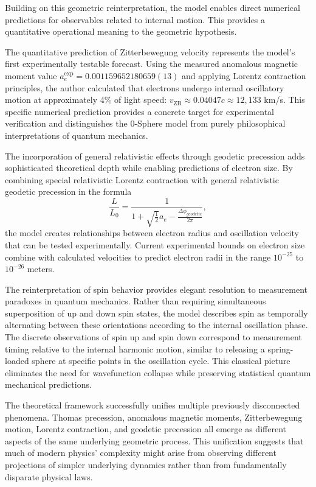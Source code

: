 \documentclass[%
 reprint,
 amsmath,amssymb,
 aps,
]{revtex4-1}
\numberwithin{equation}{section}%
\begin{document}
Building on this geometric reinterpretation, the model enables direct numerical predictions for observables related to internal motion. This provides a quantitative operational meaning to the geometric hypothesis.

The quantitative prediction of Zitterbewegung velocity represents the model's first experimentally testable forecast. Using the measured anomalous magnetic moment value $a_e^{\exp} = 0.001159652180659(13)$ and applying Lorentz contraction principles, the author calculated that electrons undergo internal oscillatory motion at approximately 4\% of light speed: $v_{\mathrm{ZB}} \approx 0.04047c \approx 12,133$ km/s. This specific numerical prediction provides a concrete target for experimental verification and distinguishes the 0-Sphere model from purely philosophical interpretations of quantum mechanics.

The incorporation of general relativistic effects through geodetic precession adds sophisticated theoretical depth while enabling predictions of electron size. By combining special relativistic Lorentz contraction with general relativistic geodetic precession in the formula
\begin{equation}
\frac{L}{L_0} = \frac{1}{1 + \sqrt{\frac{1}{2}}a_e - \frac{\Delta\phi_{geodetic}}{2\pi}},
\end{equation}
the model creates relationships between electron radius and oscillation velocity that can be tested experimentally. Current experimental bounds on electron size combine with calculated velocities to predict electron radii in the range $10^{-25}$ to $10^{-26}$ meters.

The reinterpretation of spin behavior provides elegant resolution to measurement paradoxes in quantum mechanics. Rather than requiring simultaneous superposition of up and down spin states, the model describes spin as temporally alternating between these orientations according to the internal oscillation phase. The discrete observations of spin up and spin down correspond to measurement timing relative to the internal harmonic motion, similar to releasing a spring-loaded sphere at specific points in the oscillation cycle. This classical picture eliminates the need for wavefunction collapse while preserving statistical quantum mechanical predictions.

The theoretical framework successfully unifies multiple previously disconnected phenomena. Thomas precession, anomalous magnetic moments, Zitterbewegung motion, Lorentz contraction, and geodetic precession all emerge as different aspects of the same underlying geometric process. This unification suggests that much of modern physics' complexity might arise from observing different projections of simpler underlying dynamics rather than from fundamentally disparate physical laws.
\end{document}
